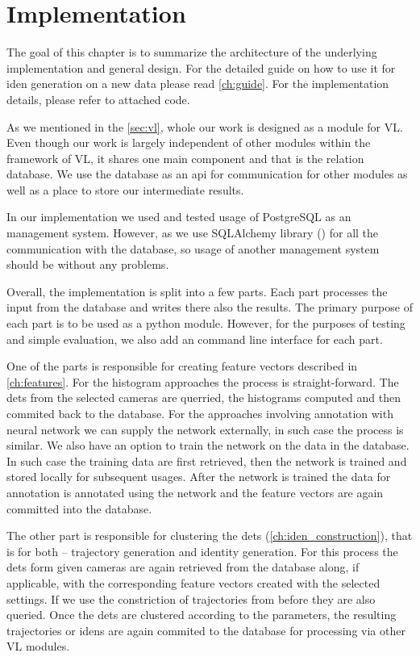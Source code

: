 \chapter{Implementation}

The goal of this chapter is to summarize the architecture of the underlying implementation and general design. For the detailed guide on how to use it for \gls{iden} generation on a new data please read \autoref{ch:guide}. For the implementation details, please refer to attached code.

As we mentioned in the \autoref{sec:vl}, whole our work is designed as a module for \gls{VL}. Even though our work is largely independent of other modules within the framework of \gls{VL}, it shares one main component and that is the relation database. We use the database as an \gls{api} for communication for other modules as well as a place to store our intermediate results.

In our implementation we used and tested usage of PostgreSQL as an management system. However, as we use SQLAlchemy library (\cite{sqlalchemy}) for all the communication with the database, so usage of another management system should be without any problems.

Overall, the implementation is split into a few parts. Each part processes the input from the database and writes there also the results. The primary purpose of each part is to be used as a python module. However, for the purposes of testing and simple evaluation, we also add an command line interface for each part.

One of the parts is responsible for creating feature vectors described in \autoref{ch:features}. For the histogram approaches the process is straight-forward. The \glspl{det} from the selected cameras are querried, the histograms computed and then commited back to the database. For the approaches involving annotation with neural network we can supply the network externally, in such case the process is similar. We also have an option to train the network on the data in the database. In such case the training data are first retrieved, then the network is trained and stored locally for subsequent usages. After the network is trained the data for annotation is annotated using the network and the feature vectors are again committed into the database.

The other part is responsible for clustering the \glspl{det} (\autoref{ch:iden_construction}), that is for both -- trajectory generation and identity generation. For this process the \glspl{det} form given cameras are again retrieved from the database along, if applicable, with the corresponding feature vectors created with the selected settings. If we use the constriction of trajectories from before they are also queried. Once the \glspl{det} are clustered according to the parameters, the resulting trajectories or \glspl{iden} are again commited to the database for processing via other \gls{VL} modules.

